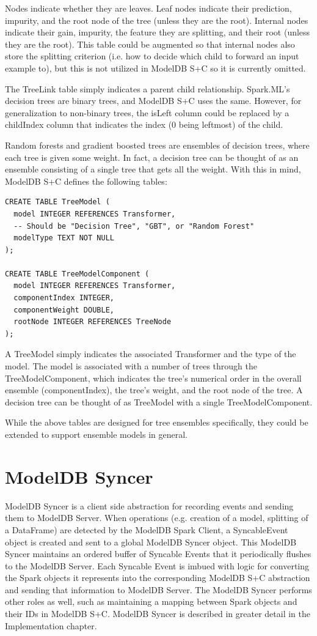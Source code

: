 Nodes indicate whether they are leaves. Leaf nodes indicate their prediction, 
impurity, and the root node of the tree (unless they are the root). 
Internal nodes indicate their gain, impurity, the feature they are splitting, 
and their root (unless they are the root). This table could be augmented so
that internal nodes also store the splitting criterion (i.e. how to decide which
child to forward an input example to), but this is not utilized in ModelDB S+C so
it is currently omitted. 

The TreeLink table simply indicates a parent child relationship. Spark.ML's 
decision trees are binary trees, and ModelDB S+C uses the same. However, for 
generalization to non-binary trees, the isLeft column could be replaced by a childIndex
column that indicates the index (0 being leftmost) of the child.

Random forests and gradient boosted trees are ensembles of decision trees, where
each tree is given some weight. In fact, a decision tree can be thought of as an
ensemble consisting of a single tree that gets all the weight. With this in mind, ModelDB S+C
defines the following tables:

\begin{verbatim}
CREATE TABLE TreeModel (
  model INTEGER REFERENCES Transformer,
  -- Should be "Decision Tree", "GBT", or "Random Forest"
  modelType TEXT NOT NULL 
);

CREATE TABLE TreeModelComponent (
  model INTEGER REFERENCES Transformer,
  componentIndex INTEGER,
  componentWeight DOUBLE,
  rootNode INTEGER REFERENCES TreeNode
);
\end{verbatim}

A TreeModel simply indicates the associated Transformer and the type of the model.
The model is associated with a number of trees through the TreeModelComponent, which
indicates the tree's numerical order in the overall ensemble (componentIndex), the
tree's weight, and the root node of the tree. A decision tree can be thought of as
TreeModel with a single TreeModelComponent.

While the above tables are designed for tree ensembles specifically, they could be
extended to support ensemble models in general.

\section{ModelDB Syncer}
ModelDB Syncer is a client side abstraction for recording events and sending them
to ModelDB Server. When operations (e.g. creation of a model, splitting of a DataFrame)
are detected by the ModelDB Spark Client, a SyncableEvent object is created and sent to
a global ModelDB Syncer object. This ModelDB Syncer maintains an ordered buffer of Syncable Events
that it periodically flushes to the ModelDB Server. Each Syncable Event is imbued with logic for converting
the Spark objects it represents into the corresponding ModelDB S+C abstraction and sending that information to
ModelDB Server. The ModelDB Syncer performs other roles as well, such as maintaining a mapping between Spark
objects and their IDs in ModelDB S+C. ModelDB Syncer is described in greater detail in the Implementation chapter.
